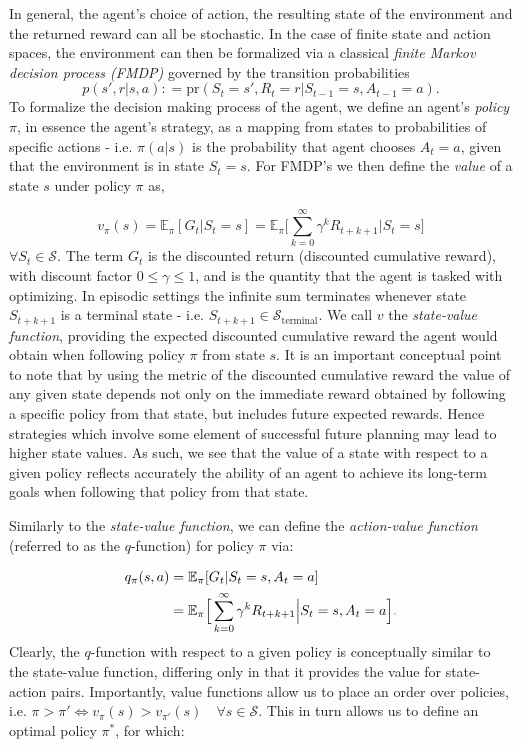 \documentclass[twocolumn,preprintnumbers,amsmath,amssymb,notitlepage,nofootinbib,longbibliography,superscriptaddress,aps,pra,10pt]{revtex4-1}
\newcommand{\defeq}{\mathrel{\mathop:}=}
\newcommand{\je}[1]{\textcolor{cyan}{#1}}
\begin{document}
	In general, the agent's choice of action, the resulting state of the environment and the returned reward can all be stochastic.
	In the case of finite state and action spaces, the environment can then be formalized via a  classical  \emph{finite Markov decision process (FMDP)} governed by the transition probabilities
	\begin{equation}
		p(s',r|s,a) \defeq \mathrm{pr}(S_t = s',R_t = r|S_{t-1} = s, A_{t-1} = a).
	\end{equation}
	To formalize the decision making process of the agent, we define an agent's \textit{policy} $\pi$, in essence the agent's strategy, as a mapping from states to probabilities of specific actions - i.e. $\pi(a|s)$ is the probability that agent chooses $A_t = a$, given that the environment is in state $S_t = s$.
	For FMDP's we then define the \textit{value} of a state $s$ under policy $\pi$ as,

	\begin{equation}
		v_{\pi}(s) = \mathbb{E}_{\pi}[G_t|S_t = s]  = \mathbb{E}_{\pi} \Big[\sum_{k = 0}^{\infty}\gamma^k R_{t+k+1}\Big| S_t = s \Big] 
	\end{equation}
	$\forall S_t \in \mathcal{S}$.
	The term $G_t$ is the discounted return (discounted cumulative reward), with discount factor $0 \leq \gamma \leq 1$, and is the quantity that the agent is tasked with optimizing.
	In episodic settings the infinite sum terminates whenever state $S_{t+k+1}$ is a terminal state - i.e. $S_{t+k+1} \in \mathcal{S}_{\mathrm{terminal}}$.
	We call $v$ the \textit{state-value function}, providing the expected discounted cumulative reward the agent would obtain when following policy $\pi$ from state $s$.
	It is an important conceptual point to note that by using the metric of the discounted cumulative reward the value of any given state depends not only on the immediate reward obtained by following a specific policy from that state, but includes future expected rewards.
	Hence strategies which involve some element of successful future planning may lead to higher state values.
	As such, we see that the value of a state with respect to a given policy reflects accurately the ability of an agent to achieve its long-term goals when following that policy from that state.

	Similarly to the \textit{state-value function}, we can define the \textit{action-value function}  (referred to as the $q$-function) for policy $\pi$ via:

	\begin{align}
		q_{\pi}(s,a) &= \mathbb{E}_{\pi}[G_t|S_t = s, A_t = a]  \nonumber\\
		& = \mathbb{E}_{\pi} \Big[\sum_{k = 0}^{\infty}\gamma^k R_{t+k+1}\Big| S_t = s, A_t = a \Big] \je{.}
	\end{align}
	Clearly, the $q$-function with respect to a given policy is conceptually similar to the state-value function, differing only in that it provides the value for state-action pairs.
	Importantly, value functions allow us to place an order over policies, i.e. $\pi > \pi' \iff v_{\pi}(s) > v_{\pi'}(s)\quad \forall s \in \mathcal{S} $.
	This in turn allows us to define an optimal policy $\pi^*$, for which:
\end{document}
